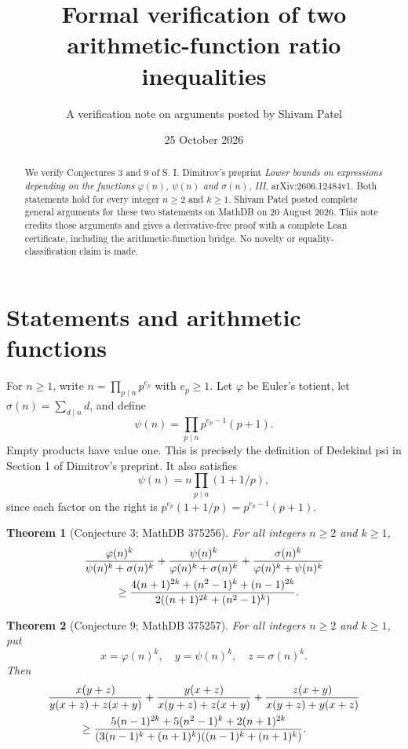 \documentclass[11pt]{article}
\title{Formal verification of two arithmetic-function ratio inequalities}
\author{A verification note on arguments posted by Shivam Patel}
\date{25 October 2026}
\newtheorem{theorem}{Theorem}
\begin{document}
\maketitle
\begin{abstract}
We verify Conjectures 3 and 9 of S. I. Dimitrov's preprint
\emph{Lower bounds on expressions depending on the functions
$\varphi(n)$, $\psi(n)$ and $\sigma(n)$, III}, arXiv:2606.12484v1.
Both statements hold for every integer $n\geq2$ and $k\geq1$.
Shivam Patel posted complete general arguments for these two statements
on MathDB on 20 August 2026. This note credits those arguments and gives
a derivative-free proof with a complete Lean certificate, including the
arithmetic-function bridge. No novelty or equality-classification claim
is made.
\end{abstract}

\section{Statements and arithmetic functions}
For $n\geq1$, write $n=\prod_{p\mid n}p^{e_p}$ with $e_p\geq1$.
Let $\varphi$ be Euler's totient, let $\sigma(n)=\sum_{d\mid n}d$, and define
\[
 \psi(n)=\prod_{p\mid n}p^{e_p-1}(p+1).
\]
Empty products have value one. This is precisely the definition of
Dedekind psi in Section 1 of Dimitrov's preprint. It also satisfies
\[
 \psi(n)=n\prod_{p\mid n}(1+1/p),
\]
since each factor on the right is
$p^{e_p}(1+1/p)=p^{e_p-1}(p+1)$.

\begin{theorem}[Conjecture 3; MathDB 375256]\label{thm:simple}
For all integers $n\geq2$ and $k\geq1$,
\begin{align*}
&\frac{\varphi(n)^k}{\psi(n)^k+\sigma(n)^k}
+\frac{\psi(n)^k}{\varphi(n)^k+\sigma(n)^k}
+\frac{\sigma(n)^k}{\varphi(n)^k+\psi(n)^k}\\
&\hspace{10mm}\geq
\frac{4(n+1)^{2k}+(n^2-1)^k+(n-1)^{2k}}
 {2((n+1)^{2k}+(n^2-1)^k)}.
\end{align*}
\end{theorem}

\begin{theorem}[Conjecture 9; MathDB 375257]\label{thm:mixed}
For all integers $n\geq2$ and $k\geq1$, put
\[
x=\varphi(n)^k,\quad y=\psi(n)^k,\quad z=\sigma(n)^k.
\]
Then
\begin{align*}
&\frac{x(y+z)}{y(x+z)+z(x+y)}
 +\frac{y(x+z)}{x(y+z)+z(x+y)}
 +\frac{z(x+y)}{x(y+z)+y(x+z)}\\
&\hspace{10mm}\geq
\frac{5(n-1)^{2k}+5(n^2-1)^k+2(n+1)^{2k}}
 {(3(n-1)^k+(n+1)^k)((n-1)^k+(n+1)^k)}.
\end{align*}
\end{theorem}
\end{document}

